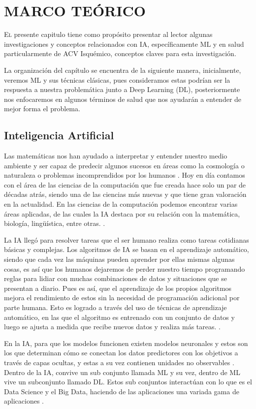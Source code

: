 \doublespacing
\chapter{MARCO TEÓRICO}
\lettrine[lines=4, slope=0.2em, findent=0.2em, nindent=0.6em]{E}l presente capitulo tiene como propósito presentar al lector algunas investigaciones y conceptos relacionados con IA, específicamente ML y en salud particularmente de ACV Isquémico, conceptos claves para esta investigación. \\
\par La organización del capítulo se encuentra de la siguiente manera, inicialmente, veremos ML y sus técnicas clásicas, pues consideramos estas podrían ser la respuesta a nuestra problemática junto a Deep Learning (DL), posteriormente nos enfocaremos en algunos términos de salud que nos ayudarán a entender de mejor forma el problema. 
\\

\doublespacing
\section{Inteligencia Artificial}
Las matemáticas nos han ayudado a interpretar y entender nuestro medio ambiente y ser capaz de predecir algunos sucesos en áreas como la cosmología o naturaleza o problemas incomprendidos por los humanos \cite{Grazia2022}. Hoy en día contamos con el área de las ciencias de la computación que fue creada hace solo un par de décadas atrás, siendo una de las ciencias más nuevas y que tiene gran valoración en la actualidad. En las ciencias de la computación podemos encontrar varias áreas aplicadas, de las cuales la IA destaca por su relación con la matemática, biología, lingüística, entre otras. \cite{Grazia2022}.\\
\par La IA llegó para resolver tareas que el ser humano realiza como tareas cotidianas básicas y complejas. Los algoritmos de IA se basan en el aprendizaje automático, siendo que cada vez las máquinas pueden aprender por ellas mismas algunas cosas, es así que los humanos dejaremos de perder nuestro tiempo programando reglas para lidiar con muchas combinaciones de datos y situaciones que se presentan a diario. Pues es así, que el aprendizaje de los propios algoritmos mejora el rendimiento de estos sin la necesidad de programación adicional por parte humana. Esto es logrado a través del uso de técnicas de aprendizaje automático, en las que el algoritmo es entrenado con un conjunto de datos y luego se ajusta a medida que recibe nuevos datos y realiza más tareas. \cite{Carola}.\\
\par En la IA, para que los modelos funcionen existen modelos neuronales y estos son los que determinan cómo se conectan los datos predictores con los objetivos a través de capas ocultas, y estas a su vez contienen unidades no observables \cite{IBM}. Dentro de la IA, convive un sub conjunto llamada ML y su vez, dentro de ML vive un subconjunto llamado DL. Estos sub conjuntos interactúan con lo que es el Data Science y el Big Data, haciendo de las aplicaciones una variada gama de aplicaciones \cite{moreno2021diseno}.\\

